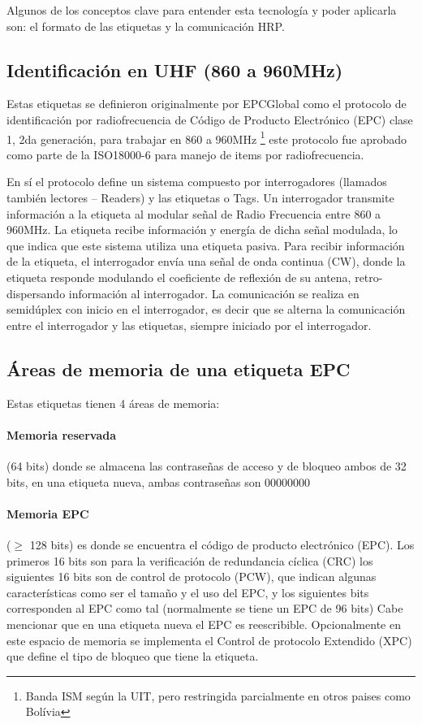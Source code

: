 \documentclass[fleqn,10pt]{SelfArx} %
\begin{document}
Algunos de los conceptos clave para entender esta tecnología y poder aplicarla son: el formato de las etiquetas y la comunicación HRP.

\subsection*{Identificación en UHF (860 a 960MHz)}

Estas etiquetas se definieron originalmente por EPCGlobal como el protocolo de identificación por radiofrecuencia de Código de Producto Electrónico (EPC) clase 1, 2da generación, para trabajar en 860 a 960MHz \footnote{Banda ISM según la UIT, pero restringida parcialmente en otros paises como Bolívia} este protocolo fue aprobado como parte de la ISO18000-6 para manejo de items por radiofrecuencia.

En sí el protocolo define un sistema compuesto por interrogadores (llamados también lectores – Readers) y las etiquetas o Tags. Un interrogador transmite información a la etiqueta al modular señal de Radio Frecuencia entre 860 a 960MHz. La etiqueta recibe información y energía de dicha señal modulada, lo que indica que este sistema utiliza una etiqueta pasiva. Para recibir información de la etiqueta, el interrogador envía una señal de onda continua (CW), donde la etiqueta responde modulando el coeficiente de reflexión de su antena, retro-dispersando información al interrogador.  La comunicación se realiza en semidúplex con inicio en el interrogador, es decir que se alterna la comunicación entre el interrogador y las etiquetas, siempre iniciado por el interrogador.

\subsection*{Áreas de memoria de una etiqueta EPC}

Estas etiquetas tienen 4 áreas de memoria:

\paragraph{Memoria reservada} (64 bits) donde se almacena las contraseñas de acceso y de bloqueo ambos de 32 bits, en una etiqueta nueva, ambas contraseñas son 00000000
\paragraph{Memoria EPC} ($\ge$ 128 bits) es donde se encuentra el código de producto electrónico (EPC). Los primeros 16 bits son para la verificación de redundancia cíclica (CRC) los siguientes 16 bits son de control de protocolo (PCW), que indican algunas características como ser el tamaño y el uso del EPC, y los siguientes bits corresponden al EPC como tal (normalmente se tiene un EPC de 96 bits) Cabe mencionar que en una etiqueta nueva el EPC es reescribible. Opcionalmente en este espacio de memoria se implementa el Control de protocolo Extendido (XPC) que define el tipo de bloqueo que tiene la etiqueta.
\end{document}
